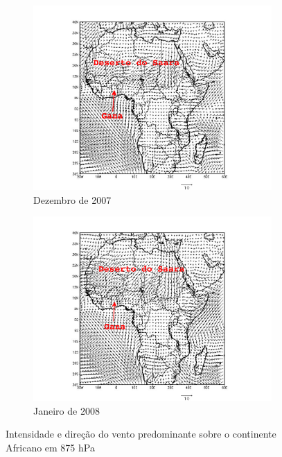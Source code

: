 \begin{figure}[H]
  \centering
  \begin{subfigure}[b]{0.5\linewidth}
    \includegraphics[width=\linewidth]{../inputs/grads/gimp/1000hPa/DEZ_2007.pdf}
    \caption{Dezembro de 2007}
  \end{subfigure}%
  \begin{subfigure}[b]{0.5\linewidth}
    \includegraphics[width=\linewidth]{../inputs/grads/gimp/1000hPa/JAN_2008.pdf}
    \caption{Janeiro de 2008}
  \end{subfigure}
  \caption{Intensidade e direção do vento predominante sobre o continente Africano
           em 875 hPa}
\end{figure}

